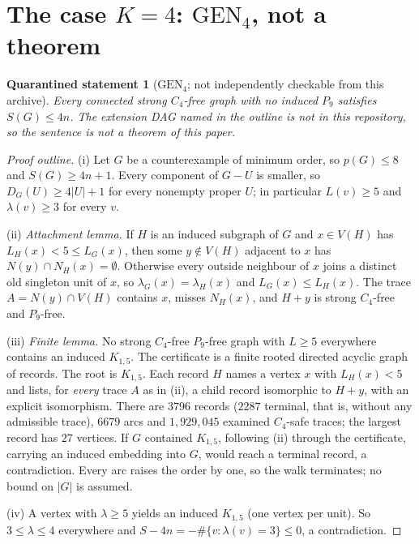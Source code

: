 \documentclass[11pt]{amsart}
\newtheorem{qrecord}[theorem]{Quarantined statement}
\theoremstyle{definition}
\theoremstyle{remark}
\newcommand{\pp}{p}
\newcommand{\GEN}{\mathrm{GEN}}
\begin{document}
\section{The case \texorpdfstring{$K=4$}{K=4}: \texorpdfstring{$\GEN_4$}{GEN4}, not a theorem}\label{sec:gen4}

\begin{qrecord}[$\GEN_4$; not independently checkable from this archive]\label{thm:gen4}
Every connected strong $C_4$-free graph with no induced $P_9$ satisfies $S(G)\le4n$. The extension DAG named in the outline is not in this repository, so the sentence is not a theorem of this paper.
\end{qrecord}

\begin{proof}[Proof outline]
(i) Let $G$ be a counterexample of minimum order, so $\pp(G)\le8$ and $S(G)\ge4n+1$. Every component of $G-U$ is smaller, so $D_G(U)\ge4|U|+1$ for every nonempty proper $U$; in particular $L(v)\ge5$ and $\lambda(v)\ge3$ for every $v$.

(ii) \emph{Attachment lemma.} If $H$ is an induced subgraph of $G$ and $x\in V(H)$ has $L_H(x)<5\le L_G(x)$, then some $y\notin V(H)$ adjacent to $x$ has $N(y)\cap N_H(x)=\emptyset$. Otherwise every outside neighbour of $x$ joins a distinct old singleton unit of $x$, so $\lambda_G(x)=\lambda_H(x)$ and $L_G(x)\le L_H(x)$. The trace $A=N(y)\cap V(H)$ contains $x$, misses $N_H(x)$, and $H+y$ is strong $C_4$-free and $P_9$-free.

(iii) \emph{Finite lemma.} No strong $C_4$-free $P_9$-free graph with $L\ge5$ everywhere contains an induced $K_{1,5}$. The certificate is a finite rooted directed acyclic graph of records. The root is $K_{1,5}$. Each record $H$ names a vertex $x$ with $L_H(x)<5$ and lists, for \emph{every} trace $A$ as in (ii), a child record isomorphic to $H+y$, with an explicit isomorphism. There are $3796$ records ($2287$ terminal, that is, without any admissible trace), $6679$ arcs and $1{,}929{,}045$ examined $C_4$-safe traces; the largest record has $27$ vertices. If $G$ contained $K_{1,5}$, following (ii) through the certificate, carrying an induced embedding into $G$, would reach a terminal record, a contradiction. Every arc raises the order by one, so the walk terminates; no bound on $|G|$ is assumed.

(iv) A vertex with $\lambda\ge5$ yields an induced $K_{1,5}$ (one vertex per unit). So $3\le\lambda\le4$ everywhere and $S-4n=-\#\{v:\lambda(v)=3\}\le0$, a contradiction.
\end{proof}
\end{document}

